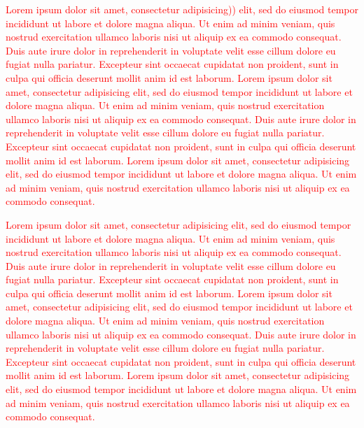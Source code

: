 \documentclass{bioinfo}
\newcommand{\col}[2][red]{\textcolor{#1}{#2}}
\begin{document}
\begin{methods}
\col[red]{Lorem ipsum dolor sit amet, consectetur adipisicing)) elit, sed do
eiusmod tempor incididunt ut labore et dolore magna aliqua. Ut enim ad
minim veniam, quis nostrud exercitation ullamco laboris nisi ut
aliquip ex ea commodo consequat. Duis aute irure dolor in
reprehenderit in voluptate velit esse cillum dolore eu fugiat nulla
pariatur. Excepteur sint occaecat cupidatat non proident, sunt in
culpa qui officia deserunt mollit anim id est laborum. Lorem ipsum
dolor sit amet, consectetur adipisicing elit, sed do eiusmod tempor
incididunt ut labore et dolore magna aliqua. Ut enim ad minim veniam,
quis nostrud exercitation ullamco laboris nisi ut aliquip ex ea
commodo consequat. Duis aute irure dolor in reprehenderit in voluptate
velit esse cillum dolore eu fugiat nulla pariatur. Excepteur sint
occaecat cupidatat non proident, sunt in culpa qui officia deserunt
mollit anim id est laborum. Lorem ipsum dolor sit amet, consectetur
adipisicing elit, sed do eiusmod tempor incididunt ut labore et dolore
magna aliqua. Ut enim ad minim veniam, quis nostrud exercitation
ullamco laboris nisi ut aliquip ex ea commodo consequat.}

\col[red]{Lorem ipsum dolor sit amet, consectetur adipisicing elit, sed do
eiusmod tempor incididunt ut labore et dolore magna aliqua. Ut enim ad
minim veniam, quis nostrud exercitation ullamco laboris nisi ut
aliquip ex ea commodo consequat. Duis aute irure dolor in
reprehenderit in voluptate velit esse cillum dolore eu fugiat nulla
pariatur. Excepteur sint occaecat cupidatat non proident, sunt in
culpa qui officia deserunt mollit anim id est laborum. Lorem ipsum
dolor sit amet, consectetur adipisicing elit, sed do eiusmod tempor
incididunt ut labore et dolore magna aliqua. Ut enim ad minim veniam,
quis nostrud exercitation ullamco laboris nisi ut aliquip ex ea
commodo consequat. Duis aute irure dolor in reprehenderit in voluptate
velit esse cillum dolore eu fugiat nulla pariatur. Excepteur sint
occaecat cupidatat non proident, sunt in culpa qui officia deserunt
mollit anim id est laborum. Lorem ipsum dolor sit amet, consectetur
adipisicing elit, sed do eiusmod tempor incididunt ut labore et dolore
magna aliqua. Ut enim ad minim veniam, quis nostrud exercitation
ullamco laboris nisi ut aliquip ex ea commodo consequat.}

\end{methods}
\end{document}
